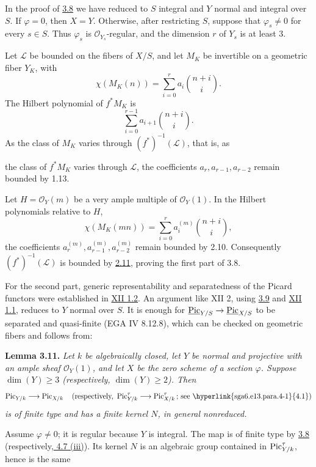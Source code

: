 In the proof of \hyperlink{sga6.e13.thm.3-8}{3.8} we have reduced to \(S\) integral and \(Y\) normal and
integral over \(S\). If \(\varphi=0\), then \(X=Y\). Otherwise, after
restricting \(S\), suppose that \(\varphi_s\ne0\) for every \(s\in S\).
Thus \(\varphi_s\) is \(\mathcal O_{Y_s}\)-regular, and the dimension
\(r\) of \(Y_s\) is at least \(3\).

Let \(\mathscr L\) be bounded on the fibers of \(X/S\), and let \(M_K\)
be invertible on a geometric fiber \(Y_K\), with
\[
\chi(M_K(n))=\sum_{i=0}^{r}a_i\binom{n+i}{i}.
\]
The Hilbert polynomial of \(f^*M_K\) is
\[
\sum_{i=0}^{r-1}a_{i+1}\binom{n+i}{i}.
\]
As the class of \(M_K\) varies through \((f^*)^{-1}(\mathscr L)\), that
is, as

the class of \(f^*M_K\) varies through \(\mathscr L\), the coefficients
\(a_r,a_{r-1},a_{r-2}\) remain bounded by 1.13.

Let \(H=\mathcal O_Y(m)\) be a very ample multiple of
\(\mathcal O_Y(1)\). In the Hilbert polynomials relative to \(H\),
\[
\chi(M_K(mn))=\sum_{i=0}^{r}a_i^{(m)}\binom{n+i}{i},
\]
the coefficients \(a_r^{(m)},a_{r-1}^{(m)},a_{r-2}^{(m)}\) remain bounded
by 2.10. Consequently \((f^*)^{-1}(\mathscr L)\) is bounded by \hyperlink{sga6.e13.lem.2-11}{2.11},
proving the first part of 3.8.

For the second part, generic representability and separatedness of the
Picard functors were established in \hyperlink{sga6.e12.cor.1-2}{XII 1.2}. An argument like XII 2,
using \hyperlink{sga6.e13.lem.3-9}{3.9} and \hyperlink{sga6.e12.thm.1-1}{XII 1.1}, reduces to \(Y\) normal over \(S\). It is enough
for \(\underline{\operatorname{Pic}}_{Y/S}\to\underline{\operatorname{Pic}}_{X/S}\) to be separated
and quasi-finite (EGA IV 8.12.8), which can be checked on geometric
fibers and follows from:

\textbf{Lemma 3.11.} \emph{Let \(k\) be algebraically closed, let \(Y\)
be normal and projective with an ample sheaf \(\mathcal O_Y(1)\), and let
\(X\) be the zero scheme of a section \(\varphi\). Suppose
\(\dim(Y)\ge3\) (respectively, \(\dim(Y)\ge2\)). Then}
\[
\Pic_{Y/k}\longrightarrow\Pic_{X/k}
\quad
\text{(respectively, }\Pic^\tau_{Y/k}\longrightarrow\Pic^\tau_{X/k}
\text{; see \hyperlink{sga6.e13.para.4-1}{4.1})}
\]
\emph{is of finite type and has a finite kernel \(N\), in general
nonreduced.}

Assume \(\varphi\ne0\); it is regular because \(Y\) is integral. The map
is of finite type by \hyperlink{sga6.e13.thm.3-8}{3.8} (respectively,\hyperlink{sga6.e13.thm.4-7}{ 4.7 (iii)}). Its kernel \(N\) is
an algebraic group contained in \(\operatorname{Pic}^\tau_{Y/k}\), hence is the same

